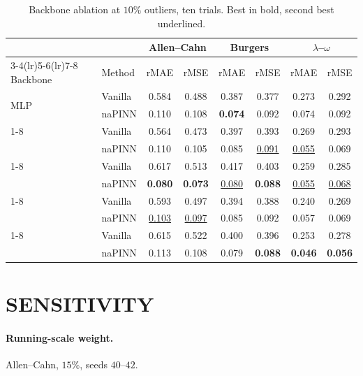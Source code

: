 \documentclass[twoside]{article}
\begin{document}
\begin{table}[h]
\centering
\small
\caption{Backbone ablation at $10\%$ outliers, ten trials. Best in bold, second
best underlined.}
\label{tab:backbone}
\vspace{4pt}
\setlength{\tabcolsep}{5pt}
\begin{tabular}{llcccccc}
\toprule
& & \multicolumn{2}{c}{Allen--Cahn} & \multicolumn{2}{c}{Burgers} & \multicolumn{2}{c}{$\lambda$--$\omega$} \\
\cmidrule(lr){3-4}\cmidrule(lr){5-6}\cmidrule(lr){7-8}
Backbone & Method & rMAE & rMSE & rMAE & rMSE & rMAE & rMSE \\
\midrule
\multirow{2}{*}{MLP}
 & Vanilla & 0.584 & 0.488 & 0.387 & 0.377 & 0.273 & 0.292 \\
 & naPINN  & 0.110 & 0.108 & \textbf{0.074} & 0.092 & 0.074 & 0.092 \\
\cmidrule(lr){1-8}
\multirow{2}{*}{KAN}
 & Vanilla & 0.564 & 0.473 & 0.397 & 0.393 & 0.269 & 0.293 \\
 & naPINN  & 0.110 & 0.105 & 0.085 & \underline{0.091} & \underline{0.055} & 0.069 \\
\cmidrule(lr){1-8}
\multirow{2}{*}{FLS}
 & Vanilla & 0.617 & 0.513 & 0.417 & 0.403 & 0.259 & 0.285 \\
 & naPINN  & \textbf{0.080} & \textbf{0.073} & \underline{0.080} & \textbf{0.088} & \underline{0.055} & \underline{0.068} \\
\cmidrule(lr){1-8}
\multirow{2}{*}{QRes}
 & Vanilla & 0.593 & 0.497 & 0.394 & 0.388 & 0.240 & 0.269 \\
 & naPINN  & \underline{0.103} & \underline{0.097} & 0.085 & 0.092 & 0.057 & 0.069 \\
\cmidrule(lr){1-8}
\multirow{2}{*}{PirateNet}
 & Vanilla & 0.615 & 0.522 & 0.400 & 0.396 & 0.253 & 0.278 \\
 & naPINN  & 0.113 & 0.108 & 0.079 & \textbf{0.088} & \textbf{0.046} & \textbf{0.056} \\
\bottomrule
\end{tabular}
\end{table}

\section{SENSITIVITY}
\label{app:sensitivity}

\paragraph{Running-scale weight.}
Allen--Cahn, $15\%$, seeds $40$--$42$.
\end{document}

